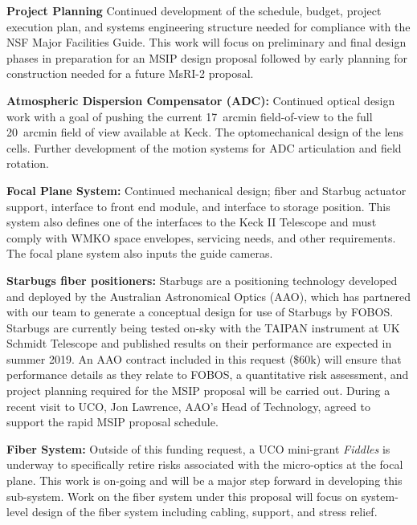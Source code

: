 \noindent \textbf{Project Planning} Continued development of the
schedule, budget, project execution plan, and systems engineering
structure needed for compliance with the NSF Major Facilities Guide.
This work will focus on preliminary and final design phases in
preparation for an MSIP design proposal followed by early planning for
construction needed for a future MsRI-2 proposal. 

\noindent \textbf{Atmospheric Dispersion Compensator (ADC):} Continued
optical design work with a goal of pushing the current 17~arcmin field-of-view
to the full 20~arcmin field of view available at Keck.  The
optomechanical design of the lens cells.  Further development of the
motion systems for ADC articulation and field rotation.

\noindent \textbf{Focal Plane System:} Continued mechanical design;
fiber and Starbug actuator support, interface to front end module, and
interface to storage position. This system also defines one of the
interfaces to the Keck II Telescope and must comply with WMKO space
envelopes, servicing needs, and other requirements. The focal plane
system also inputs the guide cameras. 

\noindent \textbf{Starbugs fiber positioners:} Starbugs are a
positioning technology developed and deployed by the Australian Astronomical Optics (AAO), which has partnered with our
team to generate a conceptual design for use of Starbugs by FOBOS.  Starbugs are currently being tested on-sky with the
TAIPAN instrument at UK Schmidt Telescope and published results on their performance are expected in summer 2019.  An
AAO contract included in this request (\$60k) will ensure that performance details as they relate to FOBOS, a
quantitative risk assessment, and project planning required for the MSIP proposal will be carried out.  During a recent
visit to UCO, Jon Lawrence, AAO's Head of Technology, agreed to support the rapid MSIP proposal schedule.

\noindent \textbf{Fiber System:} Outside of this funding request, a UCO
mini-grant {\it Fiddles} is underway to specifically retire
risks associated with the micro-optics at the focal plane.  This work is
on-going and will be a major step forward in developing this sub-system.
Work on the fiber system under this proposal will focus on system-level
design of the fiber system including cabling, support, and stress relief. 


